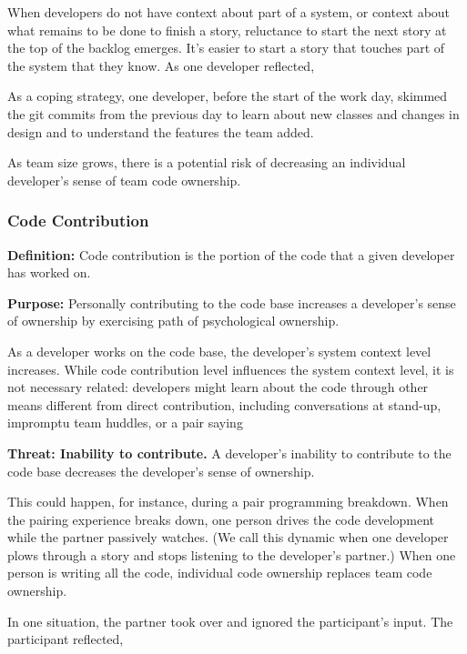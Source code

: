 When developers do not have context about part of a system, or context about what remains to be done to finish a story, reluctance to start the next story at the top of the backlog emerges. It’s easier to start a story that touches part of the system that they know. As one developer reflected, 

As a coping strategy, one developer, before the start of the work day, skimmed the git commits from the previous day to learn about new classes and changes in design and to understand the features the team added. 

As team size grows, there is a potential risk of decreasing an individual developer’s sense of team code ownership. 

\subsubsection{Code Contribution}
\textbf{Definition:} Code contribution is the portion of the code that a given developer has worked on. 

\textbf{Purpose:} Personally contributing to the code base increases a developer’s sense of ownership by exercising  path of psychological ownership. 

As a developer works on the code base, the developer’s system context level increases. While code contribution level influences the system context level, it is not necessary related: developers might learn about the code through other means different from direct contribution, including conversations at stand-up, impromptu team huddles, or a pair saying 

\textbf{Threat: Inability to contribute.}  A developer’s inability to contribute to the code base decreases the developer’s sense of ownership. 

This could happen, for instance, during a pair programming breakdown. When the pairing experience breaks down, one person drives the code development while the partner passively watches. (We call this dynamic  when one developer plows through a story and stops listening to the developer’s partner.)  When one person is writing all the code, individual code ownership replaces team code ownership.  

In one situation, the partner took over and ignored the participant’s input. The participant reflected,  

